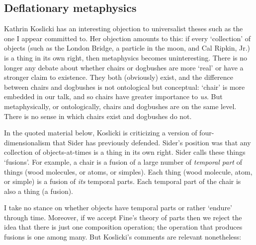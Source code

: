 \documentclass[11pt]{article}
\begin{document}
\begin{spacing}{1.25}
\begin{comment}
I will not contest this claim by van Inwagen.  That is, I will suppose
that existence is univocal, and maintain that both chairs and sets
exist in the very same sense.


Perhaps, as Jay Rosenberg suggested (see section \ref{lessons-v}), we
must have recourse to the empirical sciences.  For any given $y$s, we
may suppose that they compose a thing---that is the metaphysical
lesson we may draw.  But the question of what kind of thing they
compose is not a metaphysical question.  It is an empirical question.
\end{comment}

\section{Deflationary metaphysics}
Kathrin Koslicki has an interesting objection to universalist theses
such as the one I appear committed to.  Her objection amounts to this:
if every `collection' of objects (such as the London Bridge, a
particle in the moon, and Cal Ripkin, Jr.) is a thing in its own
right, then metaphysics becomes uninteresting.  There is no longer any
debate about whether chairs or dogbushes are more `real' or have a
stronger claim to existence.  They both (obviously) exist, and the
difference between chairs and dogbushes is not ontological but
conceptual: `chair' is more embedded in our talk, and so chairs have
greater importance to {\em us}.  But metaphysically, or ontologically,
chairs and dogbushes are on the same level.  There is no sense in
which chairs exist and dogbushes do not.

In the quoted material below, Koslicki is criticizing a version of
four-dimensionalism that Sider has previously defended.  Sider's
position was that any collection of objects-at-times is a thing in its
own right.  Sider calls these things `fusions'.  For example, a chair
is a fusion of a large number of {\em temporal part} of things (wood
molecules, or atoms, or simples).  Each thing (wood molecule, atom, or
simple) is a fusion of {\em its} temporal parts.  Each temporal part
of the chair is also a thing (a fusion).

I take no stance on whether objects have temporal parts or rather
`endure' through time.  Moreover, if we accept Fine's theory of parts
then we reject the idea that there is just one composition operation;
the operation that produces fusions is one among many.  But Koslicki's
comments are relevant nonetheless:


\end{spacing}
\end{document}
